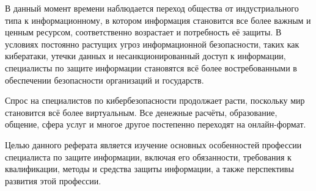 В данный момент времени наблюдается переход общества от индустриального типа к информационному, 
в котором информация становится все более важным и ценным ресурсом, соответственно возрастает и 
потребность её защиты. В условиях постоянно растущих угроз информационной безопасности, таких 
как кибератаки, утечки данных и несанкционированный доступ к информации, специалисты по защите 
информации становятся всё более востребованными в обеспечении безопасности организаций и 
государств.

Спрос на специалистов по кибербезопасности продолжает расти, поскольку мир становится всё более 
виртуальным. Все денежные расчёты, образование, общение, сфера услуг и многое другое постепенно 
переходят на онлайн-формат. 

Целью данного реферата является изучение основных особенностей профессии специалиста по защите 
информации, включая его обязанности, требования к квалификации, методы и средства защиты 
информации, а также перспективы развития этой профессии.

